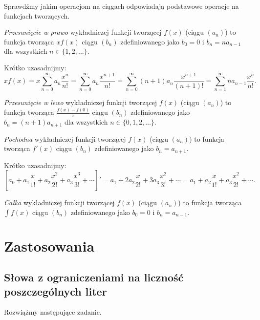 \documentclass[shortabstract]{imthesis}
\begin{document}
Sprawdźmy jakim operacjom na ciągach odpowiadają podstawowe operacje na funkcjach tworzących.

\begin{definition}
    \emph{Przesunięcie w prawo} wykładniczej funkcji tworzącej $f(x)$ (ciągu $(a_n)$) to funkcja tworząca $xf(x)$ ciągu $(b_n)$ zdefiniowanego jako $b_0 = 0$ i $b_n = na_{n-1}$ dla wszystkich $n \in \{1, 2, \ldots\}$.
\end{definition}

Krótko uzasadnijmy:
$$
xf(x) = x\sum_{n=0}^\infty a_n\frac{x^n}{n!} = \sum_{n=0}^\infty a_n\frac{x^{n+1}}{n!} = \sum_{n=0}^\infty (n+1)a_n\frac{x^{n+1}}{(n+1)!} = \sum_{n=1}^\infty na_{n-1}\frac{x^n}{n!}.
$$

\begin{definition}
    \emph{Przesunięcie w lewo} wykładniczej funkcji tworzącej $f(x)$ (ciągu $(a_n)$) to funkcja tworząca $\frac{f(x)-f(0)}{x}$ ciągu $(b_n)$ zdefiniowanego jako $b_n = (n+1)a_{n+1}$ dla wszystkich $n \in \{0, 1, 2, \ldots\}$.
\end{definition}

\begin{definition}
    \emph{Pochodna} wykładniczej funkcji tworzącej $f(x)$ (ciągu $(a_n)$) to funkcja tworząca $f'(x)$ ciągu $(b_n)$ zdefiniowanego jako $b_n = a_{n+1}$.
\end{definition}

Krótko uzasadnijmy:
$$
\left[a_0 + a_1\frac{x}{1!} + a_2\frac{x^2}{2!} + a_3\frac{x^3}{3!} + \cdots\right]' =  a_1 + 2a_2\frac{x}{2!} + 3a_3\frac{x^2}{3!} + \cdots = a_1 + a_2\frac{x}{1!} + a_3\frac{x^2}{2!} + \cdots.
$$

\begin{definition}
    \emph{Całka} wykładniczej funkcji tworzącej $f(x)$ (ciągu $(a_n)$) to funkcja tworząca $\int f(x)$ ciągu $(b_n)$ zdefiniowanego jako $b_0 = 0$ i $b_n = a_{n-1}$.
\end{definition}

\section{Zastosowania}

\subsection{Słowa z ograniczeniami na liczność poszczególnych liter}

Rozwiążmy następujące zadanie.
\end{document}
